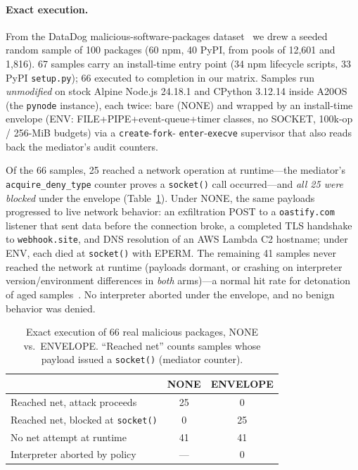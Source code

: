 \documentclass[letterpaper,twocolumn,10pt]{article}
\begin{document}
\paragraph{Exact execution.}
From the DataDog malicious-software-packages dataset~\cite{datadogdataset}
we drew a seeded random sample of 100 packages (60 npm, 40 PyPI, from
pools of 12{,}601 and 1{,}816).  67 samples carry an install-time entry
point (34 npm lifecycle scripts, 33 PyPI \texttt{setup.py}); 66 executed
to completion in our matrix.  Samples run \emph{unmodified} on stock
Alpine Node.js 24.18.1 and CPython 3.12.14 inside A20OS (the
\texttt{pynode} instance), each twice: bare (NONE) and wrapped by an
install-time envelope (ENV: FILE+PIPE+event-queue+timer classes, no
SOCKET, 100k-op / 256-MiB budgets) via a \texttt{create}-\texttt{fork}-
\texttt{enter}-\texttt{execve} supervisor that also reads back the
mediator's audit counters.

Of the 66 samples, 25 reached a network operation at runtime---the
mediator's \texttt{acquire\_deny\_type} counter proves a
\texttt{socket()} call occurred---and \emph{all 25 were blocked} under
the envelope (Table~\ref{tab:exec}).  Under NONE, the same payloads
progressed to live network behavior: an exfiltration POST to a
\texttt{oastify.com} listener that sent data before the connection
broke, a completed TLS handshake to \texttt{webhook.site}, and DNS
resolution of an AWS Lambda C2 hostname; under ENV, each died at
\texttt{socket()} with EPERM.  The remaining 41 samples never reached
the network at runtime (payloads dormant, or crashing on interpreter
version/environment differences in \emph{both} arms)---a normal hit
rate for detonation of aged samples~\cite{duan2021measuring}.  No
interpreter aborted under the envelope, and no benign behavior was
denied.

\begin{table}[t]
\centering
\caption{Exact execution of 66 real malicious packages, NONE vs.\
ENVELOPE.  ``Reached net'' counts samples whose payload issued a
\texttt{socket()} (mediator counter).}
\label{tab:exec}
\small
\begin{tabular}{@{}lcc@{}}
\toprule
 & \textbf{NONE} & \textbf{ENVELOPE} \\
\midrule
Reached net, attack proceeds & 25 & 0 \\
Reached net, blocked at \texttt{socket()} & 0 & 25 \\
No net attempt at runtime & 41 & 41 \\
Interpreter aborted by policy & --- & 0 \\
\bottomrule
\end{tabular}
\end{table}
\end{document}
